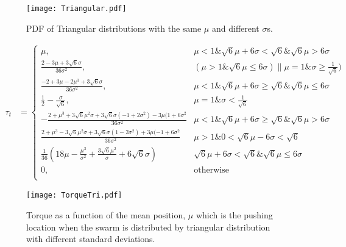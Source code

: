 \begin{figure}
\begin{center}
	\texttt{[image: Triangular.pdf]}
\end{center}
\vspace{-1em}
\caption{\label{fig:pdfTri}
PDF of Triangular distributions with the same $\mu$ and different $\sigma$s.
}
\vspace{-1em}
\end{figure}
\begin{align}
\tau_t &=  \left\{
\begin{array}{ll}
    \mu, &  \mu<1 \& \sqrt{6} \mu + 6 \sigma < \sqrt{6} \& \sqrt{6} \mu > 6 \sigma\\
    \frac{2-3\mu+3\sqrt{6}\sigma}{36\sigma^2}, & (\mu>1\&\sqrt{6}\mu \leq 6\sigma) \| \mu =1 \& \sigma \geq \frac{1}{\sqrt{6}})\\
    \frac{-2+3\mu-2\mu^3+3\sqrt{6}\sigma}{36\sigma^2}, &  \mu<1 \& \sqrt{6}\mu+6\sigma\geq \sqrt{6} \& \sqrt{6} \mu \leq 6\sigma\\
    \frac{1}{2}-\frac{\sigma}{\sqrt{6}}, &   \mu = 1 \& \sigma < \frac{1}{\sqrt{6}}\\
    -\frac{2+\mu^3+3\sqrt{6}\mu^2\sigma+3\sqrt{6}\sigma(-1+2\sigma^2)-3\mu(1+6\sigma^2}{36\sigma^2} & \mu<1 \& \sqrt{6} \mu + 6 \sigma \geq \sqrt{6} \& \sqrt{6} \mu > 6 \sigma\\
    \frac{2+\mu^3-3\sqrt{6}\mu^2\sigma+3\sqrt{6}\sigma(1-2\sigma^2)+3\mu(-1+6\sigma^2}{36\sigma^2} & \mu>1 \& 0<\sqrt{6}\mu-6\sigma<\sqrt{6}\\
    \frac{1}{36}(18\mu-\frac{\mu^3}{\sigma^2} + \frac{3\sqrt{6}\mu^2}{\sigma}+6\sqrt{6}\sigma) &  \sqrt{6} \mu+6\sigma<\sqrt{6}\&\sqrt{6}\mu\leq 6\sigma\\
     0, & \textrm{otherwise}\\ 
\end{array} 
\right.
\end{align}

\begin{figure}
\begin{center}
	\texttt{[image: TorqueTri.pdf]}
\end{center}
\vspace{-1em}
\caption{\label{fig:torqueTri}
Torque as a function of the mean position, $\mu$ which is the pushing location when the swarm is distributed by triangular distribution with different standard deviations.
}
\vspace{-1em}
\end{figure}


